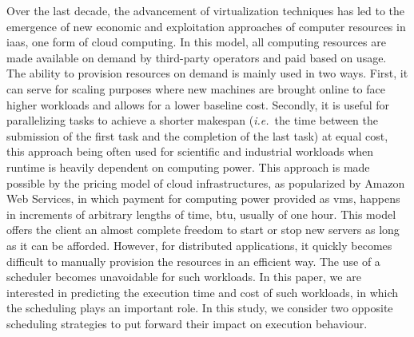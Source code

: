 \documentclass[]{llncs}
\begin{document}
Over the  last decade, the advancement  of virtualization techniques has  led to
the emergence of new economic  and exploitation approaches of computer resources
in  \ac{iaas}, one  form  of  cloud computing.   In  this  model, all  computing
resources are made  available on demand by third-party operators  and paid based
on usage.  The  ability to provision resources  on demand is mainly  used in two
ways.  First, it  can serve for scaling purposes where  new machines are brought
online to face higher workloads and allows for a lower baseline cost.
Secondly, it  is useful  for parallelizing tasks to  achieve a  shorter makespan
(\textit{i.e.}\  the time  between  the  submission of  the  first task and  the
completion of the  last task) at equal  cost, this approach being  often used for
scientific  and  industrial  workloads  when runtime  is  heavily  dependent  on
computing power.  This  approach is made possible by the  pricing model of cloud
infrastructures, as  popularized by Amazon Web Services, in which
payment  for computing  power provided  as \acp{vm},  happens in  increments of
arbitrary lengths of  time, \ac{btu}, usually of one hour. %
%
This model  offers the client  an almost complete freedom  to start or  stop new
servers as long as it can be afforded. However, for distributed applications, it
quickly becomes  difficult to manually  provision the resources in  an efficient
way.  The  use of a scheduler  becomes unavoidable for such  workloads.  In this
paper,  we are  interested in  predicting the  execution time  and cost  of such
workloads, in which  the scheduling plays an important role.   In this study, we
consider  two opposite  scheduling strategies  to  put forward  their impact  on
execution behaviour.
\end{document}
